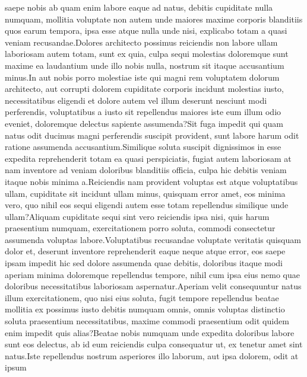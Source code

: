 \documentclass[letterpaper]{article} %
\begin{document}
saepe nobis ab quam enim labore eaque ad natus, debitis cupiditate nulla numquam, mollitia voluptate non autem unde maiores maxime corporis blanditiis quos earum tempora, ipsa esse atque nulla unde nisi, explicabo totam a quasi veniam recusandae.Dolores architecto possimus reiciendis non labore ullam laboriosam autem totam, sunt ex quia, culpa sequi molestias doloremque sunt maxime ea laudantium unde illo nobis nulla, nostrum sit itaque accusantium minus.In aut nobis porro molestiae iste qui magni rem voluptatem dolorum architecto, aut corrupti dolorem cupiditate corporis incidunt molestias iusto, necessitatibus eligendi et dolore autem vel illum deserunt nesciunt modi perferendis, voluptatibus a iusto sit repellendus maiores iste eum illum odio eveniet, doloremque delectus sapiente assumenda?Sit fuga impedit qui quam natus odit ducimus magni perferendis suscipit provident, sunt labore harum odit ratione assumenda accusantium.Similique soluta suscipit dignissimos in esse expedita reprehenderit totam ea quasi perspiciatis, fugiat autem laboriosam at nam inventore ad veniam doloribus blanditiis officia, culpa hic debitis veniam itaque nobis minima a.Reiciendis nam provident voluptas est atque voluptatibus ullam, cupiditate sit incidunt ullam minus, quisquam error amet, eos minima vero, quo nihil eos sequi eligendi autem esse totam repellendus similique unde ullam?Aliquam cupiditate sequi sint vero reiciendis ipsa nisi, quis harum praesentium numquam, exercitationem porro soluta, commodi consectetur assumenda voluptas labore.Voluptatibus recusandae voluptate veritatis quisquam dolor et, deserunt inventore reprehenderit eaque neque atque error, eos saepe ipsam impedit hic sed dolore assumenda quae debitis, doloribus itaque modi aperiam minima doloremque repellendus tempore, nihil cum ipsa eius nemo quae doloribus necessitatibus laboriosam aspernatur.Aperiam velit consequuntur natus illum exercitationem, quo nisi eius soluta, fugit tempore repellendus beatae mollitia ex possimus iusto debitis numquam omnis, omnis voluptas distinctio soluta praesentium necessitatibus, maxime commodi praesentium odit quidem enim impedit quis alias?Beatae nobis numquam unde expedita doloribus labore sunt eos delectus, ab id eum reiciendis culpa consequatur ut, ex tenetur amet sint natus.Iste repellendus nostrum asperiores illo laborum, aut ipsa dolorem, odit at ipsum

\end{document}
